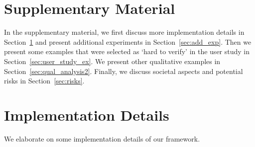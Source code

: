 \setcounter{section}{0} 

\section*{Supplementary Material} In the supplementary material, we first discuss more implementation details in Section~\ref{sec:implem} and present additional experiments in Section~\ref{sec:add_exp}. Then we present some examples that were selected as `hard to verify' in the user study in Section~\ref{sec:user_study_ex}. We present other qualitative examples in Section~\ref{sec:qual_analysis2}. Finally, we discuss societal aspects and potential risks in Section~\ref{sec:risks}.


\section{Implementation Details} \label{sec:implem}
We elaborate on some implementation details of our framework. 

